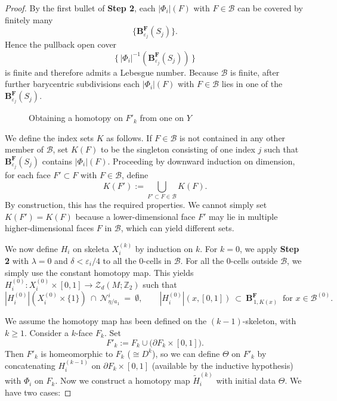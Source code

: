 \documentclass[10pt,a4paper]{amsart}
\begin{document}
\begin{proof}
By the first bullet of \textbf{Step 2}, each $|\Phi_i|(F)$ with $F\in\mathcal B$ can be covered by finitely many
\begin{equation*}
    \{\mathbf{B}^\mathbf{F}_{\varepsilon_j}(S_j)\}.
\end{equation*}
Hence the pullback open cover
\begin{equation*}
    \{\,|\Phi_i|^{-1}(\mathbf{B}^\mathbf{F}_{\varepsilon_j}(S_j))\,\}
\end{equation*}
is finite and therefore admits a Lebesgue number. Because $\mathcal B$ is finite, after further barycentric subdivisions each $|\Phi_i|(F)$ with $F\in\mathcal B$ lies in one of the $\mathbf{B}^\mathbf{F}_{\varepsilon_j}(S_j)$.

\begin{figure}
\centering

\caption{Obtaining a homotopy on $F'_k$ from one on $Y$}
\label{YFkk}
\end{figure}

We define the index sets $K$ as follows. If $F\in\mathcal B$ is not contained in any other member of $\mathcal B$, set $K(F)$ to be the singleton consisting of one index $j$ such that $\mathbf{B}^\mathbf{F}_{\varepsilon_j}(S_j)$ contains $|\Phi_i|(F)$. Proceeding by downward induction on dimension, for each face $F'\subset F$ with $F\in\mathcal B$, define
\begin{equation*}
K(F') := \bigcup_{F'\subset F\in\mathcal B} K(F).
\end{equation*}
By construction, this has the required properties. We cannot simply set $K(F')=K(F)$ because a lower-dimensional face $F'$ may lie in multiple higher-dimensional faces $F$ in $\mathcal B$, which can yield different sets.

We now define \(H_i\) on skeleta \(X_i^{(k)}\) by induction on \(k\). For $k = 0$, we apply \textbf{Step 2} with $\lambda = 0$ and $\delta < \varepsilon_i/4$ to all the $0$-cells in $\mathcal{B}$. For all the $0$-cells outside $\mathcal{B}$, we simply use the constant homotopy map. This yields $H_i^{(0)}: X_i^{(0)}\times[0,1]\to \mathcal Z_d(M;\mathbb Z_2)$ such that
\begin{equation*}
    |H_i^{(0)}|(X_i^{(0)}\times\{1\})\ \cap\ \mathcal N^i_{\eta/a_1}\ =\ \emptyset,
    \qquad
    |H_i^{(0)}|(x,[0,1])\ \subset\ \mathbf B^{\mathbf F}_{\,1,K(x)}
    \ \text{ for }x\in\mathcal B^{(0)}.
\end{equation*}

We assume the homotopy map has been defined on the $(k-1)$-skeleton, with $k\ge 1$. Consider a $k$-face $F_k$. Set
\begin{equation*}
F'_k := F_k \cup \bigl(\partial F_k \times [0,1]\bigr).
\end{equation*}
Then $F'_k$ is homeomorphic to $F_k$ ($\cong D^k$), so we can define $\Theta$ on $F'_k$ by concatenating $H^{(k-1)}_i$ on $\partial F_k \times [0,1]$ (available by the inductive hypothesis) with $\Phi_i$ on $F_k$. Now we construct a homotopy map $\tilde H^{(k)}_i$ with initial data $\Theta$. We have two cases:


\end{proof}
\end{document}
